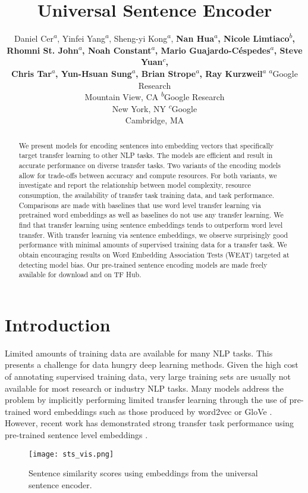 \documentclass[11pt,a4paper]{article}
\title{Universal Sentence Encoder}
\author{Daniel Cer\textsuperscript{$a$}, 
        Yinfei Yang\textsuperscript{$a$}, 
        Sheng-yi Kong\textsuperscript{$a$},
        \rm\textbf{Nan Hua\textsuperscript{$a$}, 
        Nicole Limtiaco\textsuperscript{$b$},} \\
        \rm\textbf{Rhomni St. John\textsuperscript{$a$},
        Noah Constant\textsuperscript{$a$},
        Mario Guajardo-C\'espedes\textsuperscript{$a$},
        Steve Yuan\textsuperscript{$c$},} \\
\rm\textbf{Chris Tar\textsuperscript{$a$}, Yun{-}Hsuan Sung\textsuperscript{$a$},
        Brian Strope\textsuperscript{$a$},
        Ray Kurzweil\textsuperscript{$a$}} \AND
  {\rm\textsuperscript{$a$}Google Research}\\Mountain View, CA \And
  {\rm\textsuperscript{$b$}Google Research}\\New York, NY
  \And
  {\rm\textsuperscript{$c$}Google}\\Cambridge, MA
}
\date{}
\begin{document}
\maketitle
\begin{abstract}
We present models for encoding sentences into embedding vectors that specifically target transfer learning to other NLP tasks. The models are efficient and result in accurate performance on diverse transfer tasks. Two variants of the encoding models allow for trade-offs between accuracy and compute resources. For both variants, we investigate and report the relationship between model complexity, resource consumption, the availability of transfer task training data, and task performance. Comparisons are made with baselines that use word level transfer learning via pretrained word embeddings as well as baselines do not use any transfer learning. We find that transfer learning using sentence embeddings tends to outperform word level transfer. With transfer learning via sentence embeddings, we observe surprisingly good performance with minimal amounts of supervised training data for a transfer task. We obtain encouraging results on Word Embedding Association Tests (WEAT) targeted at detecting model bias. Our pre-trained sentence encoding models are made freely available for download and on TF Hub.

\end{abstract}

\section{Introduction}

Limited amounts of training data are available for many NLP tasks. This presents a challenge for data hungry deep learning methods. Given the high cost of annotating supervised training data, very large training sets are usually not available for most research or industry NLP tasks. Many models address the problem by implicitly performing limited transfer learning through the use of pre-trained word embeddings such as those produced by word2vec \cite{mikolov2013} or GloVe \cite{pennington2014glove}. However, recent work has demonstrated strong transfer task performance using pre-trained sentence level embeddings \cite{conneau2017}.


\begin{figure}
  \texttt{[image: sts\_vis.png]}
  \caption{Sentence similarity scores using embeddings from the universal sentence encoder.}
\label{fig:sts_vis}
\end{figure}
\end{document}
